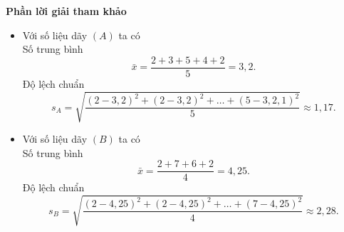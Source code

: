 \begin{bt}
{\begin{itemize}
 \end{itemize}
 \textbf{Phần lời giải tham khảo}
 \begin{itemize}
 	\item Với số liệu dãy $(A)$ ta có\\
 	Số trung bình  $$\bar{x}=\dfrac{2+3+5+4+2}{5}=3{,2}.$$
 	Độ lệch chuẩn
 	$$
 	s_A=\sqrt{\dfrac{(2-3{,2})^{2}+(2-3{,2})^2+\ldots+(5-3{,2}{,}1)^{2}}{5}}\approx 1{,}17.
 	$$
 	\item Với số liệu dãy $(B)$ ta có\\
 	Số trung bình  $$\bar{x}=\dfrac{2+7+6+2}{4}=4{,}25.$$
 	Độ lệch chuẩn
 	$$
 	s_B=\sqrt{\dfrac{(2-4{,}25)^{2}+(2-4{,}25)^2+\ldots+(7-4{,}25)^{2}}{4}}\approx 2{,}28.
 	$$
 \end{itemize}
}
\end{bt}
